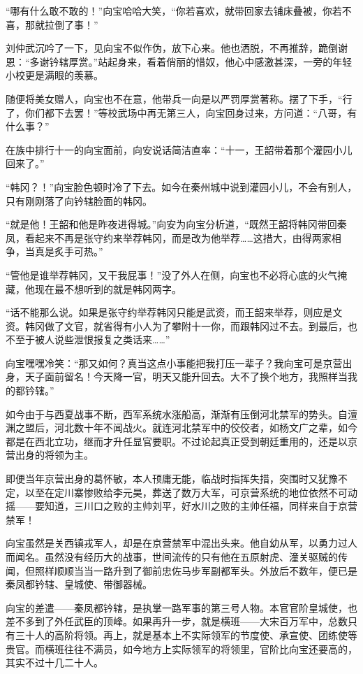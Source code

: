 “哪有什么敢不敢的！”向宝哈哈大笑，“你若喜欢，就带回家去铺床叠被，你若不喜，那就拉倒了事！”

刘仲武沉吟了一下，见向宝不似作伪，放下心来。他也洒脱，不再推辞，跪倒谢恩：“多谢钤辖厚赏。”站起身来，看着俏丽的惜奴，他心中感激甚深，一旁的年轻小校更是满眼的羡慕。

随便将美女赠人，向宝也不在意，他带兵一向是以严罚厚赏著称。摆了下手，“行了，你们都下去罢！”等校武场中再无第三人，向宝回身过来，方问道：“八哥，有什么事？”

在族中排行十一的向宝面前，向安说话简洁直率：“十一，王韶带着那个灌园小儿回来了。”

“韩冈？！”向宝脸色顿时冷了下去。如今在秦州城中说到灌园小儿，不会有别人，只有刚刚落了向钤辖脸面的韩冈。

“就是他！王韶和他是昨夜进得城。”向安为向宝分析道，“既然王韶将韩冈带回秦凤，看起来不再是张守约来举荐韩冈，而是改为他举荐……这措大，由得两家相争，当真是炙手可热。”

“管他是谁举荐韩冈，又干我屁事！”没了外人在侧，向宝也不必将心底的火气掩藏，他现在最不想听到的就是韩冈两字。

“话不能那么说。如果是张守约举荐韩冈只能是武资，而王韶来举荐，则应是文资。韩冈做了文官，就省得有小人为了攀附十一你，而跟韩冈过不去。到最后，也不至于被人说些泄恨报复之类话来……”

向宝嘿嘿冷笑：“那又如何？真当这点小事能把我打压一辈子？我向宝可是京营出身，天子面前留名！今天降一官，明天又能升回去。大不了换个地方，我照样当我的都钤辖。”

如今由于与西夏战事不断，西军系统水涨船高，渐渐有压倒河北禁军的势头。自澶渊之盟后，河北数十年不闻战火。就连河北禁军中的佼佼者，如杨文广之辈，如今都是在西北立功，继而才升任显官要职。不过论起真正受到朝廷重用的，还是以京营出身的将领为主。

即便当年京营出身的葛怀敏，本人顸庸无能，临战时指挥失措，突围时又犹豫不定，以至在定川寨惨败给李元昊，葬送了数万大军，可京营系统的地位依然不可动摇——要知道，三川口之败的主帅刘平，好水川之败的主帅任福，同样来自于京营禁军！

向宝虽然是关西镇戎军人，却是在京营禁军中混出头来。他自幼从军，以勇力过人而闻名。虽然没有经历大的战事，世间流传的只有他在五原射虎、潼关驱贼的传闻，但照样顺顺当当一路升到了御前忠佐马步军副都军头。外放后不数年，便已是秦凤都钤辖、皇城使、带御器械。

向宝的差遣——秦凤都钤辖，是执掌一路军事的第三号人物。本官官阶皇城使，也差不多到了外任武臣的顶峰。如果再升一步，就是横班——大宋百万军中，总数只有三十人的高阶将领。再上，就是基本上不实际领军的节度使、承宣使、团练使等贵官。而横班往往不满员，如今地方上实际领军的将领里，官阶比向宝还要高的，其实不过十几二十人。

